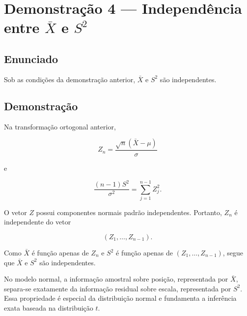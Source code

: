 \documentclass[
  letterpaper,
  DIV=11,
  numbers=noendperiod]{scrreprt}
\begin{document}
\section*{\texorpdfstring{Demonstração 4 --- Independência entre
\(\bar X\) e
\(S^2\)}{Demonstração 4 --- Independência entre \textbackslash bar X e S\^{}2}}\label{demonstrauxe7uxe3o-4-independuxeancia-entre-bar-x-e-s2}


\subsection*{Enunciado}\label{enunciado-3}

Sob as condições da demonstração anterior, \(\bar X\) e \(S^2\) são
independentes.

\subsection*{Demonstração}\label{demonstrauxe7uxe3o-4}

Na transformação ortogonal anterior,

\[
Z_n=\frac{\sqrt n(\bar X-\mu)}{\sigma}
\]

e

\[
\frac{(n-1)S^2}{\sigma^2}
=
\sum_{j=1}^{n-1}Z_j^2.
\]

O vetor \(Z\) possui componentes normais padrão independentes. Portanto,
\(Z_n\) é independente do vetor

\[
(Z_1,\ldots,Z_{n-1}).
\]

Como \(\bar X\) é função apenas de \(Z_n\) e \(S^2\) é função apenas de
\((Z_1,\ldots,Z_{n-1})\), segue que \(\bar X\) e \(S^2\) são
independentes.

\begin{tcolorbox}[enhanced jigsaw, colback=white, leftrule=.75mm, colbacktitle=quarto-callout-tip-color!10!white, breakable, titlerule=0mm, bottomtitle=1mm, title=\textcolor{quarto-callout-tip-color}{\faLightbulb}\hspace{0.5em}{Interpretação}, colframe=quarto-callout-tip-color-frame, toprule=.15mm, opacityback=0, bottomrule=.15mm, opacitybacktitle=0.6, arc=.35mm, toptitle=1mm, rightrule=.15mm, coltitle=black, left=2mm]

No modelo normal, a informação amostral sobre posição, representada por
\(\bar X\), separa-se exatamente da informação residual sobre escala,
representada por \(S^2\). Essa propriedade é especial da distribuição
normal e fundamenta a inferência exata baseada na distribuição \(t\).

\end{tcolorbox}
\end{document}
